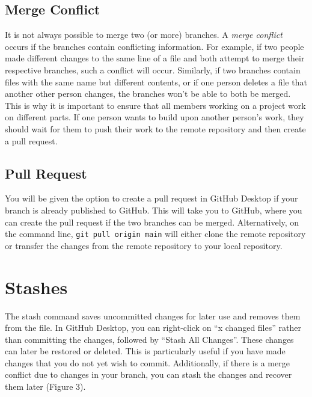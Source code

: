 \documentclass[10pt,twocolumn]{article}
\begin{document}
\subsection{Merge Conflict}

It is not always possible to merge two (or more) branches. A \textit{merge conflict} occurs if the branches contain conflicting information. For example, if two people made different changes to the same line of a file and both attempt to merge their respective branches, such a conflict will occur. Similarly, if two branches contain files with the same name but different contents, or if one person deletes a file that another other person changes, the branches won’t be able to both be merged. This is why it is important to ensure that all members working on a project work on different parts. If one person wants to build upon another person’s work, they should wait for them to push their work to the remote repository and then create a pull request.

\subsection{Pull Request}

You will be given the option to create a pull request in GitHub Desktop if your branch is already published to GitHub. This will take you to GitHub, where you can create the pull request if the two branches can be merged. Alternatively, on the command line, \texttt{git pull origin main} will either clone the remote repository or transfer the changes from the remote repository to your local repository. 

\section{Stashes}

The stash command saves uncommitted changes for later use and removes them from the file. In GitHub Desktop, you can right-click on “x changed files” rather than committing the changes, followed by “Stash All Changes”. These changes can later be restored or deleted. This is particularly useful if you have made changes that you do not yet wish to commit. Additionally, if there is a merge conflict due to changes in your branch, you can stash the changes and recover them later (Figure 3).
\end{document}
